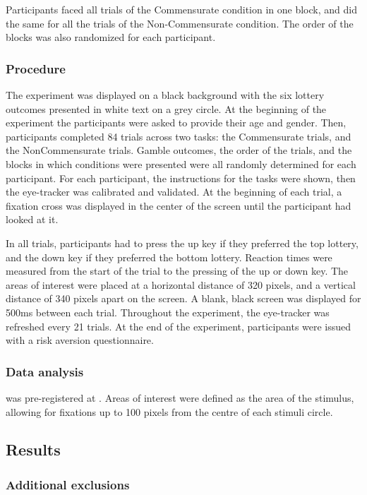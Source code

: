 \documentclass[doc, a4paper, apacite]{apa6}
\begin{document}
Participants faced all trials of the Commensurate condition in one block, and did the same for all the trials of the Non-Commensurate condition. The order of the blocks was also randomized for each participant.

\subsubsection{Procedure}
The experiment was displayed on a black background with the six lottery outcomes presented in white text on a grey circle. At the beginning of the experiment the participants were asked to provide their age and gender. Then, participants completed 84 trials across two tasks: the Commensurate trials, and the NonCommensurate trials. Gamble outcomes, the order of the trials, and the blocks in which conditions were presented were all randomly determined for each participant. For each participant, the instructions for the tasks were shown, then the eye-tracker was calibrated and validated. At the beginning of each trial, a fixation cross was displayed in the center of the screen until the participant had looked at it. 

In all trials, participants had to press the up key if they preferred the top lottery, and the down key if they preferred the bottom lottery. Reaction times were measured from the start of the trial to the pressing of the up or down key. The areas of interest were placed at a horizontal distance of 320 pixels, and a vertical distance of 340 pixels apart on the screen. A blank, black screen was displayed for 500ms between each trial. Throughout the experiment, the eye-tracker was refreshed every 21 trials. At the end of the experiment, participants were issued with a risk aversion questionnaire.

\subsubsection{Data analysis}
 was pre-registered at \url{}.
Areas of interest were defined as the area of the stimulus, allowing for fixations up to 100 pixels from the centre of each stimuli circle. 

\subsection{Results}

\subsubsection{Additional exclusions}
\end{document}
